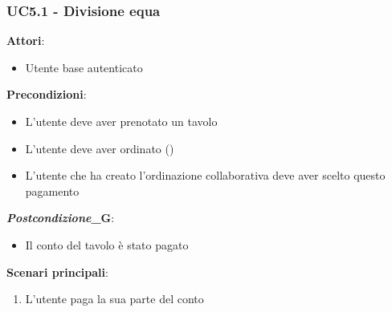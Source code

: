 \subsubsection{UC5.1 - Divisione equa}\label{usecase:5.1}
\textbf{Attori}:
\begin{itemize}
    \item Utente base autenticato
\end{itemize}
\textbf{Precondizioni}:
\begin{itemize}
    \item L'utente deve aver prenotato un tavolo
    \item L'utente deve aver ordinato ()
    \item L'utente che ha creato l'ordinazione collaborativa deve aver scelto questo pagamento
\end{itemize}
\textbf{\textit{Postcondizione}_G}:
\begin{itemize}
    \item Il conto del tavolo è stato pagato
\end{itemize}
\textbf{Scenari principali}:
\begin{enumerate}
    \item L'utente paga la sua parte del conto
\end{enumerate}